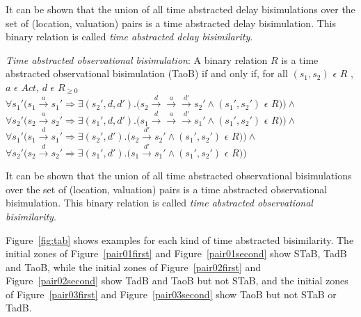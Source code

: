 It can be shown that the
  union of all time abstracted delay bisimulations over the set of
  (location, valuation) pairs is a time abstracted delay
  bisimulation. This binary relation is called \textit{time abstracted
    delay bisimilarity}.

\begin{definition}
  \emph{Time abstracted observational bisimulation}: A binary relation
  $R$ is a time abstracted observational bisimulation (TaoB) if and only if, for all
  $(s_1, s_2)$ $\epsilon$ $R$ , $a$ $\epsilon$ $Act $, $d$ $\epsilon$ $R_{\ge 0}$\\
  $\forall s_1' (s_1 \xrightarrow{a} s_1' \Rightarrow \exists (s_2',
  d, d') . (s_2 \xrightarrow{d} \xrightarrow{a} \xrightarrow{d'} s_2'
  \wedge (s_1', s_2')$ $\epsilon$ $R ) ) \wedge $ \\
  $\forall s_2' (s_2 \xrightarrow{a} s_2' \Rightarrow \exists (s_1',
  d, d') . (s_1 \xrightarrow{d} \xrightarrow{a} \xrightarrow{d'} s_1'
  \wedge (s_1', s_2')$ $\epsilon$ $R ) ) \wedge $ \\
  $\forall s_1' (s_1 \xrightarrow{d} s_1' \Rightarrow \exists (s_2',
  d')
  . (s_2 \xrightarrow{d'} s_2' \wedge (s_1', s_2')$ $\epsilon$ $R ) )
  \wedge $ \\
  $\forall s_2' (s_2 \xrightarrow{d} s_2' \Rightarrow \exists (s_1', d')
  . (s_1 \xrightarrow{d'} s_1' \wedge (s_1', s_2')$ $\epsilon$ $R ) ) $ \\
\end{definition}

It can be shown that
  the union of all time abstracted observational bisimulations over the
  set of (location, valuation) pairs is a time abstracted observational
  bisimulation. This binary relation is called \textit{time abstracted
    observational bisimilarity}.

Figure~\ref{fig:tab} shows examples for each kind of time abstracted
bisimilarity. The initial zones of Figure~\ref{pair01first} and
Figure~\ref{pair01second} show STaB, TadB and TaoB, while the initial
zones of Figure~\ref{pair02first} and Figure~\ref{pair02second} show
TadB and TaoB but not STaB, and the initial zones of Figure~\ref{pair03first} and
Figure~\ref{pair03second} show TaoB but not STaB or TadB.
